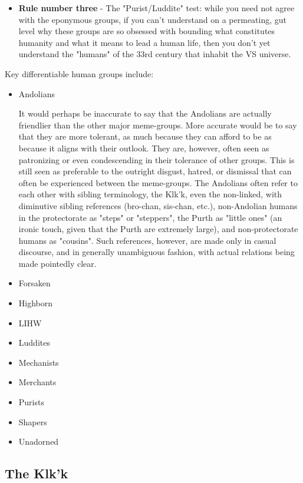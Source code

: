 \begin{itemize}
\item {\bf Rule number three} - The "Purist/Luddite" test: while you need
not agree with the eponymous groups, if you can't understand on a
permeating, gut level why these groups are so obsessed with bounding
what constitutes humanity and what it means to lead a human life, then
you don't yet understand the "humans" of the 33rd century that inhabit
the VS universe.
\end{itemize}
Key differentiable human groups include:
\begin{itemize}
\item Andolians

It would perhaps be inaccurate to say that the Andolians are actually
friendlier than the other major meme-groups. More accurate would be to
say that they are more tolerant, as much because they can afford to be
as because it aligns with their outlook. They are, however, often seen
as patronizing or even condescending in their tolerance of other
groups. This is still seen as preferable to the outright disgust,
hatred, or dismissal that can often be experienced between the
meme-groups. The Andolians often refer to each other with sibling
terminology, the Klk'k, even the non-linked, with diminutive sibling
references (bro-chan, sis-chan, etc.), non-Andolian humans in the
protectorate as "steps" or "steppers", the Purth as "little ones" (an
ironic touch, given that the Purth are extremely large), and
non-protectorate humans as "cousins". Such references, however, are
made only in casual discourse, and in generally unambiguous fashion,
with actual relations being made pointedly clear.

\item Forsaken
\item Highborn
\item LIHW
\item Luddites
\item Mechanists
\item Merchants
\item Purists
\item Shapers
\item Unadorned
\end{itemize}

\subsection{The Klk'k}

